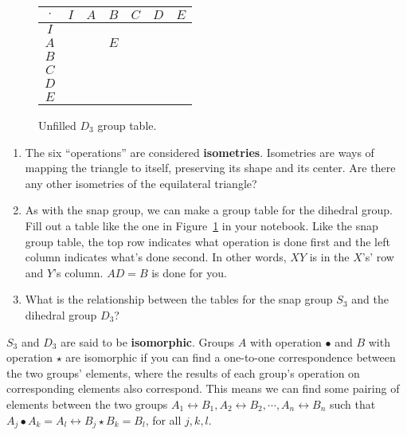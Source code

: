 \documentclass[../gatm.tex]{subfiles}
\begin{document}
\begin{figure}[h]
	\begin{center}
		\begin{minipage}[b]{0.35\textwidth}
			\centering
			\begin{tabular}{c|cccccc}
				\hline
				$\cdot$ & $I$ & $A$ & $B$ & $C$ & $D$ & $E$ \\ \hline
				\rowcolor{light-gray}
				$I$    &   &   &   &   &   &   \\ 
				$A$    &   &   & $E$ &   &   &   \\ 
				\rowcolor{light-gray}
				$B$    &   &   &   &   &   &   \\ 
				$C$    &   &   &   &   &   &   \\ 
				\rowcolor{light-gray}
				$D$    &   &   &   &   &   &   \\ 
				$E$    &   &   &   &   &   &   \\ \hline
			\end{tabular}
			\vspace*{0.5\baselineskip}
		\end{minipage}
	\end{center}
	\vspace*{-2\baselineskip}
	\begin{center}
		\begin{minipage}[t]{\textwidth}
			\caption{Unfilled $D_3$ group table.}
			\label{fig:sbstable}
		\end{minipage}
	\end{center}
\end{figure}

%
\begin{enumerate}
\item The six ``operations'' are considered \textbf{isometries}. Isometries are ways of mapping the triangle to itself, preserving its shape and its center. Are there any other isometries of the equilateral triangle?
\item As with the snap group, we can make a group table for the dihedral group. Fill out a table like the one in Figure~\ref{fig:sbstable} in your notebook. Like the snap group table, the top row indicates what operation is done first and the left column indicates what's done second. In other words, $XY$ is in the $X$'s' row and $Y$'s column. $AD=B$ is done for you.
\item What is the relationship between the tables for the snap group $S_3$ and the dihedral group $D_3$?
\setcounter{enumLast}{\theenumi}
\end{enumerate}
$S_3$ and $D_3$ are said to be \textbf{isomorphic}. Groups $A$ with operation $\bullet$ and $B$ with operation $\star$ are isomorphic if you can find a one-to-one correspondence between the two groups' elements, where the results of each group's operation on corresponding elements also correspond. This means we can find some pairing of elements between the two groups $A_1\leftrightarrow B_1, A_2\leftrightarrow B_2, \cdots, A_n \leftrightarrow B_n$ such that $A_j \bullet A_k = A_l \leftrightarrow B_j \star B_k = B_l$, for all $j,k,l$.
\end{document}
